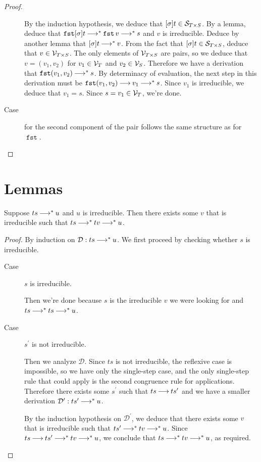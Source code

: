 \documentclass[11pt,letterpaper]{article}
\newcommand{\fst}{\operatorname{\mathtt{fst}}}
\begin{document}
\begin{proof}
\begin{description}
      By the induction hypothesis, we deduce that $[\sigma] t \in \mathcal{S}_{T \times S}$.
      By a lemma, deduce that $\fst \s t \evalto^* \fst v \evalto^* s$ and $v$ is
      irreducible.
      Deduce by another lemma that $[\sigma] t \mathbin{\longrightarrow}^* v$.
      From the fact that $[\sigma] t \in \mathcal{S}_{T \times S}$,
      deduce that $v \in \mathcal{V}_{T \times S}$.
      The only elements of $\mathcal{V}_{T \times S}$ are pairs, so we deduce
      that $v = (v_1, v_2)$ for $v_1 \in \mathcal{V}_T$ and $v_2 \in \mathcal{V}_S$.
      Therefore we have a derivation that $\fst (v_1, v_2) \evalto^* s$.
      By determinacy of evaluation, the next step in this derivation must be
      $\fst (v_1, v_2) \evalto v_1 \evalto^* s$.
      Since $v_1$ is irreducible, we deduce that $v_1 = s$.
      Since $s = v_1 \in \mathcal{V}_T$, we're done.

    \item[Case] for the second component of the pair follows the same structure
      as for $\fst$.
  \end{description}
\end{proof}


\appendix
\section{Lemmas}

\begin{lem}
  \label{lem:midway-reducible-1}
  Suppose $t s \mathbin{\longrightarrow}^* u$ and $u$ is irreducible.
  Then there exists some $v$ that is irreducible such that
  $t s \mathbin{\longrightarrow}^* t v \mathbin{\longrightarrow}^* u$.
\end{lem}

\begin{proof}
  By induction on $\mathcal{D} : t s \mathbin{\longrightarrow}^* u$.
  We first proceed by checking whether $s$ is irreducible.

  \begin{description}
    \item[Case] $s$ is irreducible.

      Then we're done because $s$ is the irreducible $v$ we were looking
      for and $t s \mathbin{\longrightarrow}^* t s \mathbin{\longrightarrow}^* u$.

    \item[Case] $s^\prime$ is not irreducible.

      Then we analyze $\mathcal{D}$.
      Since $t s$ is not irreducible, the reflexive case is impossible, so we
      have only the single-step case, and the only single-step rule that could
      apply is the second congruence rule for applications.
      Therefore there exists some $s^\prime$ such that $t s \mathbin{\longrightarrow} t s^\prime$
      and we have a smaller derivation $\mathcal{D}^\prime : t s^\prime
      \mathbin{\longrightarrow}^* u$.

      By the induction hypothesis on $\mathcal{D}^\prime$, we deduce that there
      exists some $v$ that is irreducible such that $t s^\prime \mathbin{\longrightarrow}^* t v
      \mathbin{\longrightarrow}^* u$.
      Since $t s \mathbin{\longrightarrow} t s^\prime \mathbin{\longrightarrow}^* t v \mathbin{\longrightarrow}^* u$,
      we conclude that $t s \mathbin{\longrightarrow}^* t v \mathbin{\longrightarrow}^* u$, as required.
  \end{description}
\end{proof}
\end{document}
